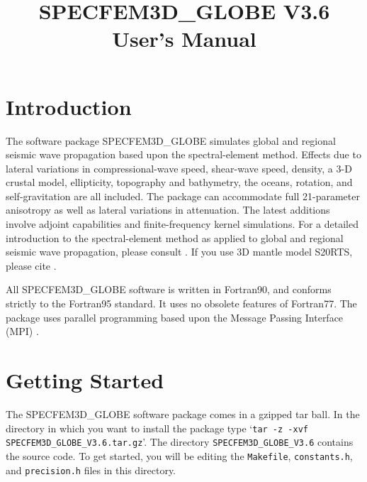 \documentclass[onecolumn]{article}
\title{
\textbf{\Huge{SPECFEM3D\_GLOBE V3.6}} \\
\vspace{1.0cm}
User's Manual \\
}
\begin{document}
\maketitle

\newpage

\tableofcontents

\newpage

\section{Introduction}

The software package SPECFEM3D\_GLOBE simulates global and regional
seismic wave propagation based upon the spectral-element method.
Effects due to lateral variations in compressional-wave speed,
shear-wave speed, density, a 3-D crustal model, ellipticity,
topography and bathymetry, the oceans, rotation, and
self-gravitation are all included.
The package can accommodate full 21-parameter anisotropy as well as
lateral variations in attenuation.
The latest additions involve adjoint capabilities and finite-frequency
kernel simulations.
For a detailed introduction to the spectral-element method as applied
to global and regional seismic wave propagation, please consult
\cite{KoTr02a,KoTr02b,KoRiTr02}.
If you use 3D mantle model S20RTS, please cite \cite{RiVaWo99}.

All SPECFEM3D\_GLOBE software is written in Fortran90, and conforms strictly to
the Fortran95 standard. It uses no obsolete features of Fortran77.
The package uses parallel programming based upon the
Message Passing Interface (MPI) \cite{GrLuSk94,Pac97}.

\section{Getting Started}
\label{section:gettingstarted}

The SPECFEM3D\_GLOBE software package comes in a gzipped tar ball.
In the directory in which you want to install the package type
`\texttt{tar -z -xvf SPECFEM3D\_GLOBE\_V3.6.tar.gz}'.
The directory \texttt{SPECFEM3D\_GLOBE\_V3.6} contains the source code.
To get started, you will be editing the \texttt{Makefile},
\texttt{constants.h}, and \texttt{precision.h} files in this
directory.
\end{document}
